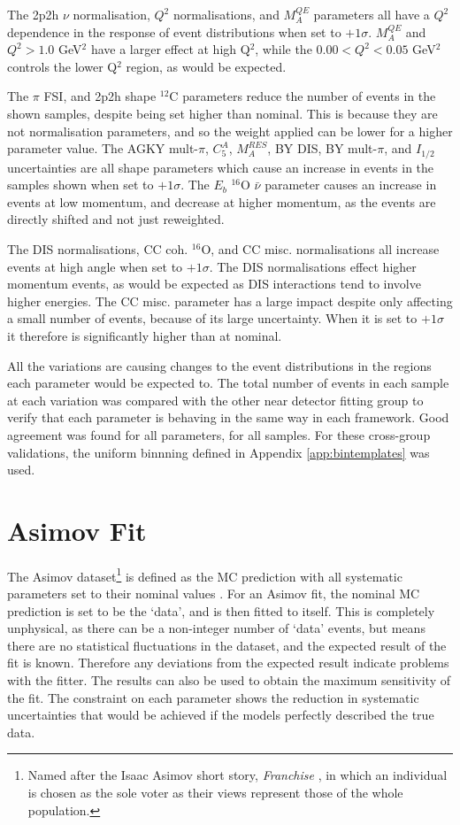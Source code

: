 The 2p2h $\nu$ normalisation, $Q^2$ normalisations, and $M^{QE}_A$ parameters all have a $Q^2$ dependence in the response of event distributions when set to $+1\sigma$. $M^{QE}_A$ and $Q^{2}>1.0$ GeV$^2$ have a larger effect at high Q$^2$, while the $0.00<Q^{2}<0.05$ GeV$^2$ controls the lower Q$^2$ region, as would be expected.

The $\pi$ FSI, and 2p2h shape $^{12}$C parameters reduce the number of events in the shown samples, despite being set higher than nominal. This is because they are not normalisation parameters, and so the weight applied can be lower for a higher parameter value. The AGKY mult-$\pi$, $C^{A}_{5}$, $M^{RES}_{A}$, BY DIS, BY mult-$\pi$, and $I_{1/2}$ uncertainties are all shape parameters which cause an increase in events in the samples shown when set to $+1\sigma$. The $E_{b}$ $^{16}$O $\bar{\nu}$ parameter causes an increase in events at low momentum, and decrease at higher momentum, as the events are directly shifted and not just reweighted.

The DIS normalisations, CC coh. $^{16}$O, and CC misc. normalisations all increase events at high angle when set to $+1\sigma$. The DIS normalisations effect higher momentum events, as would be expected as DIS interactions tend to involve higher energies. The CC misc. parameter has a large impact despite only affecting a small number of events, because of its large uncertainty. When it is set to $+1\sigma$ it therefore is significantly higher than at nominal.

All the variations are causing changes to the event distributions in the regions each parameter would be expected to. The total number of events in each sample at each variation was compared with the other near detector fitting group to verify that each parameter is behaving in the same way in each framework. Good agreement was found for all parameters, for all samples. For these cross-group validations, the uniform binnning defined in Appendix \ref{app:bintemplates} was used.

\section{Asimov Fit}\label{sec:asimov}

The Asimov dataset\footnote{Named after the Isaac Asimov short story, \textit{Franchise} \cite{asmv}, in which an individual is chosen as the sole voter as their views represent those of the whole population.} is defined as the MC prediction with all systematic parameters set to their nominal values \cite{Cowan_2011}. For an Asimov fit, the nominal MC prediction is set to be the `data', and is then fitted to itself. This is completely unphysical, as there can be a non-integer number of `data' events, but means there are no statistical fluctuations in the dataset, and the expected result of the fit is known. Therefore any deviations from the expected result indicate problems with the fitter. The results can also be used to obtain the maximum sensitivity of the fit. The constraint on each parameter shows the reduction in systematic uncertainties that would be achieved if the models perfectly described the true data.

